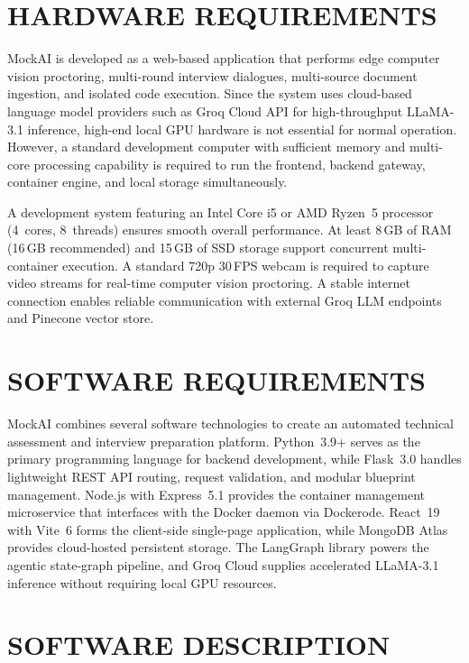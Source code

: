 \documentclass[12pt,a4paper]{report}
\begin{document}
\section{HARDWARE REQUIREMENTS}

MockAI is developed as a web-based application that performs edge computer vision
proctoring, multi-round interview dialogues, multi-source document ingestion, and isolated
code execution. Since the system uses cloud-based language model providers such as Groq
Cloud API for high-throughput LLaMA-3.1 inference, high-end local GPU hardware is not
essential for normal operation. However, a standard development computer with sufficient
memory and multi-core processing capability is required to run the frontend, backend
gateway, container engine, and local storage simultaneously.

A development system featuring an Intel Core i5 or AMD Ryzen~5 processor (4~cores,
8~threads) ensures smooth overall performance. At least 8\,GB of RAM (16\,GB
recommended) and 15\,GB of SSD storage support concurrent multi-container execution.
A standard 720p 30\,FPS webcam is required to capture video streams for real-time
computer vision proctoring. A stable internet connection enables reliable communication
with external Groq LLM endpoints and Pinecone vector store.

\section{SOFTWARE REQUIREMENTS}

MockAI combines several software technologies to create an automated technical assessment
and interview preparation platform. Python~3.9+ serves as the primary programming
language for backend development, while Flask~3.0 handles lightweight REST API routing,
request validation, and modular blueprint management. Node.js with Express~5.1 provides
the container management microservice that interfaces with the Docker daemon via
Dockerode. React~19 with Vite~6 forms the client-side single-page application, while
MongoDB Atlas provides cloud-hosted persistent storage. The LangGraph library powers
the agentic state-graph pipeline, and Groq Cloud supplies accelerated LLaMA-3.1
inference without requiring local GPU resources.

\section{SOFTWARE DESCRIPTION}
\end{document}
